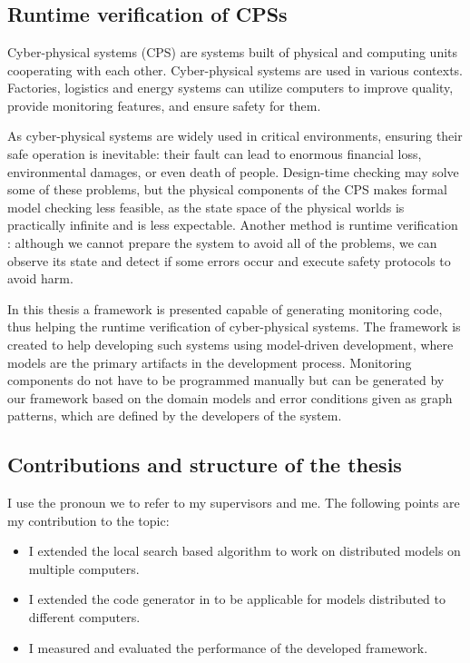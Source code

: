 \chapter{\bevezetes}

\section{Runtime verification of CPSs}
Cyber-physical systems (CPS) \cite{Krupitzer2015,Nielsen2015,Sztipanovits2012}  are systems built of physical and computing units cooperating with each other.
Cyber-physical systems are used in various contexts. 
Factories, logistics and energy systems can utilize computers to improve quality, provide monitoring features, and ensure safety for them.

As cyber-physical systems are widely used in critical environments, ensuring their safe operation is inevitable: their fault can lead to enormous financial loss, environmental damages, or even death of people.
Design-time checking may solve some of these problems, but the physical components of the CPS makes formal model checking less feasible, as the state space of the physical worlds is practically infinite and is less expectable.
Another method is runtime verification \cite{fasecikk}: although we cannot prepare the system to avoid all of the problems, we can observe its state and detect if some errors occur and execute safety protocols to avoid harm. 


In this thesis a framework is presented capable of generating monitoring code, thus helping the runtime verification of cyber-physical systems. 
The framework is created to help developing such systems using model-driven development, where models are the primary artifacts in the development process.
Monitoring components do not have to be programmed manually but can be generated by our framework based on the domain models and error conditions given as graph patterns, which are defined by the developers of the system.

\section{Contributions and structure of the thesis}

I use the pronoun we to refer to my supervisors and me. 
The following points are my contribution to the topic:
\begin{itemize}
	\item I extended the local search based algorithm to work on distributed models on multiple computers.
	\item I extended the code generator in \cite{doczi} to be applicable for models distributed to different computers. 
	\item I measured and evaluated the performance of the developed framework.
\end{itemize}
	

